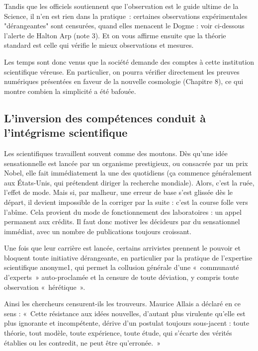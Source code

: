 \documentclass[a4paper,12pt]{article}
\begin{document}
Tandis que les officiels soutiennent que l’observation est le guide ultime de la Science, il n’en est rien dans la pratique : certaines observations expérimentales "dérangeantes" sont censurées, quand elles menacent le Dogme : voir ci-dessous l’alerte de Halton Arp (note 3). Et on vous affirme ensuite que la théorie standard est celle qui vérifie le mieux observations et mesures.


Les temps sont donc venus que la société demande des comptes à cette institution scientifique véreuse. En particulier, on pourra vérifier directement les preuves numériques présentées en faveur de la nouvelle cosmologie (Chapitre 8), ce qui montre combien la simplicité a été bafouée.




\subsection {L'inversion des compétences conduit à l'intégrisme scientifique}

Les scientifiques travaillent souvent comme des moutons. Dès qu'une idée sensationnelle est lancée par un organisme prestigieux, ou consacrée par un prix Nobel, elle fait immédiatement la une des quotidiens (ça commence généralement aux États-Unis, qui prétendent diriger la recherche mondiale). Alors, c'est la ruée, l'effet de mode. 
Mais si, par malheur, une erreur de base s'est glissée dès le départ, il devient impossible de la corriger par la suite : c'est la course folle vers l'abîme. Cela provient du mode de fonctionnement des laboratoires : un appel permanent aux crédits. Il faut donc motiver les décideurs par du sensationnel immédiat, avec un nombre de publications toujours croissant.
 
Une fois que leur carrière est lancée, certains arrivistes prennent le pouvoir et bloquent toute initiative dérangeante, en particulier par la pratique de l'expertise scientifique anonyme1, qui permet la collusion générale d'une « communauté d'experts » auto-proclamée et la censure de toute déviation, y compris toute observation « hérétique ». 

Ainsi les chercheurs censurent-ils les trouveurs. Maurice Allais a déclaré en ce sens : « Cette résistance aux idées nouvelles, d'autant plus virulente qu'elle est plus ignorante et incompétente, dérive d'un postulat toujours sous-jacent : toute théorie, tout modèle, toute expérience, toute étude, qui s'écarte des vérités établies ou les contredit, ne peut être qu'erronée. » 
\end{document}
